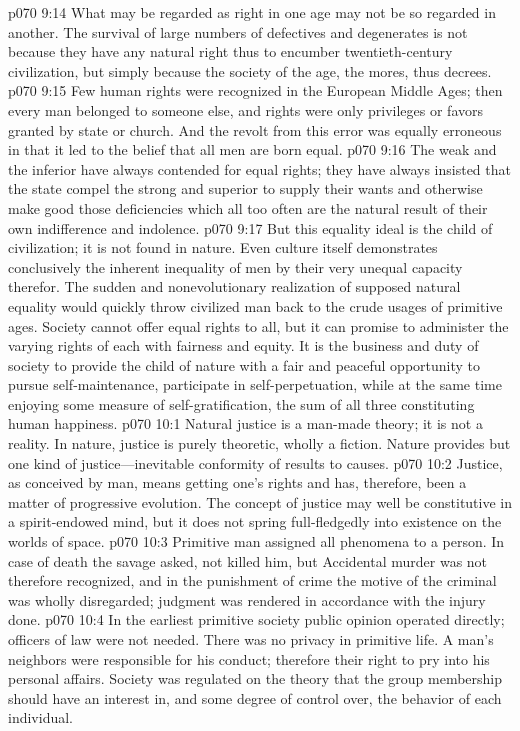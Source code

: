\vs p070 9:14 What may be regarded as right in one age may not be so regarded in another. The survival of large numbers of defectives and degenerates is not because they have any natural right thus to encumber twentieth\hyp{}century civilization, but simply because the society of the age, the mores, thus decrees.
\vs p070 9:15 Few human rights were recognized in the European Middle Ages; then every man belonged to someone else, and rights were only privileges or favors granted by state or church. And the revolt from this error was equally erroneous in that it led to the belief that all men are born equal.
\vs p070 9:16 The weak and the inferior have always contended for equal rights; they have always insisted that the state compel the strong and superior to supply their wants and otherwise make good those deficiencies which all too often are the natural result of their own indifference and indolence.
\vs p070 9:17 But this equality ideal is the child of civilization; it is not found in nature. Even culture itself demonstrates conclusively the inherent inequality of men by their very unequal capacity therefor. The sudden and nonevolutionary realization of supposed natural equality would quickly throw civilized man back to the crude usages of primitive ages. Society cannot offer equal rights to all, but it can promise to administer the varying rights of each with fairness and equity. It is the business and duty of society to provide the child of nature with a fair and peaceful opportunity to pursue self\hyp{}maintenance, participate in self\hyp{}perpetuation, while at the same time enjoying some measure of self\hyp{}gratification, the sum of all three constituting human happiness.\plusone
{}
\vs p070 10:1 Natural justice is a man\hyp{}made theory; it is not a reality. In nature, justice is purely theoretic, wholly a fiction. Nature provides but one kind of justice---inevitable conformity of results to causes.
\vs p070 10:2 Justice, as conceived by man, means getting one’s rights and has, therefore, been a matter of progressive evolution. The concept of justice may well be constitutive in a spirit\hyp{}endowed mind, but it does not spring full\hyp{}fledgedly into existence on the worlds of space.
\vs p070 10:3 Primitive man assigned all phenomena to a person. In case of death the savage asked, not  killed him, but  Accidental murder was not therefore recognized, and in the punishment of crime the motive of the criminal was wholly disregarded; judgment was rendered in accordance with the injury done.
\pc \vs p070 10:4 In the earliest primitive society public opinion operated directly; officers of law were not needed. There was no privacy in primitive life. A man’s neighbors were responsible for his conduct; therefore their right to pry into his personal affairs. Society was regulated on the theory that the group membership should have an interest in, and some degree of control over, the behavior of each individual.
